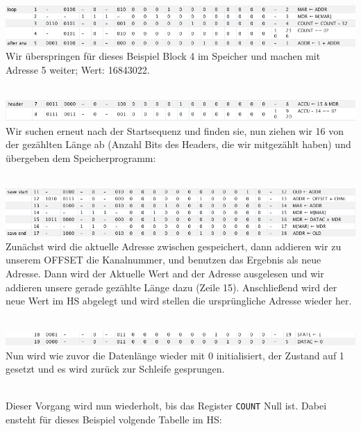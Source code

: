 \documentclass[12pt,titlepage]{article}
\begin{document}
\leavevmode \\
\includegraphics[width=16cm]{listing/row1-5.png}
\leavevmode \\

Wir überspringen für dieses Beispiel Block 4 im Speicher und machen mit Adresse 5 weiter; Wert: 16843022.

\leavevmode \\
\includegraphics[width=16cm]{listing/row7-8.png}
\leavevmode \\

Wir suchen erneut nach der Startsequenz und finden sie, nun ziehen wir 16 von der gezählten Länge ab (Anzahl Bits des Headers, die wir
mitgezählt haben) und übergeben dem Speicherprogramm:

\leavevmode \\
\includegraphics[width=16cm]{listing/row11-17.png}
\leavevmode \\

Zunächst wird die aktuelle Adresse zwischen gespeichert, dann addieren wir zu unserem OFFSET die Kanalnummer, und benutzen das Ergebnis
als neue Adresse. Dann wird der Aktuelle Wert and der Adresse ausgelesen und wir addieren unsere gerade gezählte Länge dazu (Zeile 15).
Anschließend wird der neue Wert im HS abgelegt und wird stellen die ursprüngliche Adresse wieder her.

\leavevmode \\
\includegraphics[width=16cm]{listing/row18-19.png}
\leavevmode \\

Nun wird wie zuvor die Datenlänge wieder mit 0 initialisiert, der Zustand auf 1 gesetzt und es wird zurück zur Schleife gesprungen.

\leavevmode \\

Dieser Vorgang wird nun wiederholt, bis das Register \texttt{COUNT} Null ist. Dabei ensteht für dieses Beispiel volgende Tabelle im HS:
\end{document}
